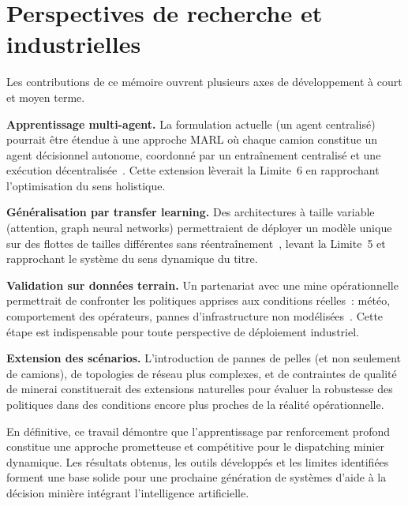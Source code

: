 \documentclass[11pt,a4paper]{report}
\begin{document}
\section*{Perspectives de recherche et industrielles}

Les contributions de ce mémoire ouvrent plusieurs axes de développement à court et moyen terme.

\textbf{Apprentissage multi-agent.} La formulation actuelle (un agent centralisé) pourrait être étendue à une approche MARL où chaque camion constitue un agent décisionnel autonome, coordonné par un entraînement centralisé et une exécution décentralisée~\cite{Zhao2025HierarchicalMARL}. Cette extension lèverait la Limite~6 en rapprochant l'optimisation du sens holistique.

\textbf{Généralisation par transfer learning.} Des architectures à taille variable (attention, graph neural networks) permettraient de déployer un modèle unique sur des flottes de tailles différentes sans réentraînement~\cite{WZeng2022}, levant la Limite~5 et rapprochant le système du sens dynamique du titre.

\textbf{Validation sur données terrain.} Un partenariat avec une mine opérationnelle permettrait de confronter les politiques apprises aux conditions réelles~: météo, comportement des opérateurs, pannes d'infrastructure non modélisées~\cite{HazrathosseiniAfrapoli2024}. Cette étape est indispensable pour toute perspective de déploiement industriel.

\textbf{Extension des scénarios.} L'introduction de pannes de pelles (et non seulement de camions), de topologies de réseau plus complexes, et de contraintes de qualité de minerai constituerait des extensions naturelles pour évaluer la robustesse des politiques dans des conditions encore plus proches de la réalité opérationnelle.

En définitive, ce travail démontre que l'apprentissage par renforcement profond constitue une approche prometteuse et compétitive pour le dispatching minier dynamique. Les résultats obtenus, les outils développés et les limites identifiées forment une base solide pour une prochaine génération de systèmes d'aide à la décision minière intégrant l'intelligence artificielle.

\newpage

\newpage
\end{document}
